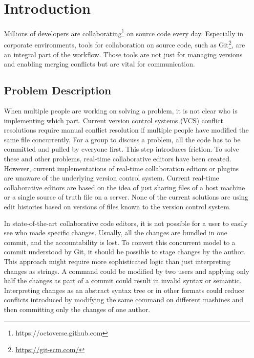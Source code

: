\chapter{Introduction}
\label{sec:introduction}

Millions of developers are collaborating\footnote{https://octoverse.github.com} on source code every day.
Especially in corporate environments, tools for collaboration on source code, such as Git\footnote{\href{https://git-scm.com/}{https://git-scm.com/}}, are an integral part of the workflow.
Those tools are not just for managing versions and enabling merging conflicts but are vital for communication.

\section{Problem Description}

When multiple people are working on solving a problem, it is not clear who is implementing which part. Current version control systems (VCS) conflict resolutions require manual conflict resolution if multiple people have modified the same file concurrently.
For a group to discuss a problem, all the code has to be committed and pulled by everyone first. This step introduces friction. To solve these and other problems, real-time collaborative editors have been created.
However, current implementations of real-time collaboration editors or plugins are unaware of the underlying version control system. Current real-time collaborative editors are based on the idea of just sharing files of a host machine or a single source of truth file on a server. None of the current solutions are using edit histories based on versions of files known to the version control system.

In state-of-the-art collaborative code editors, it is not possible for a user to easily see who made specific changes. Usually, all the changes are bundled in one commit, and the accountability is lost. To convert this concurrent model to a commit understood by Git, it should be possible to stage changes by the author. This approach might require more sophisticated logic than just interpreting changes as strings. A command could be modified by two users and applying only half the changes as part of a commit could result in invalid syntax or semantic. Interpreting changes as an abstract syntax tree or in other formats could reduce conflicts introduced by modifying the same command on different mashines and then committing only the changes of one author.

